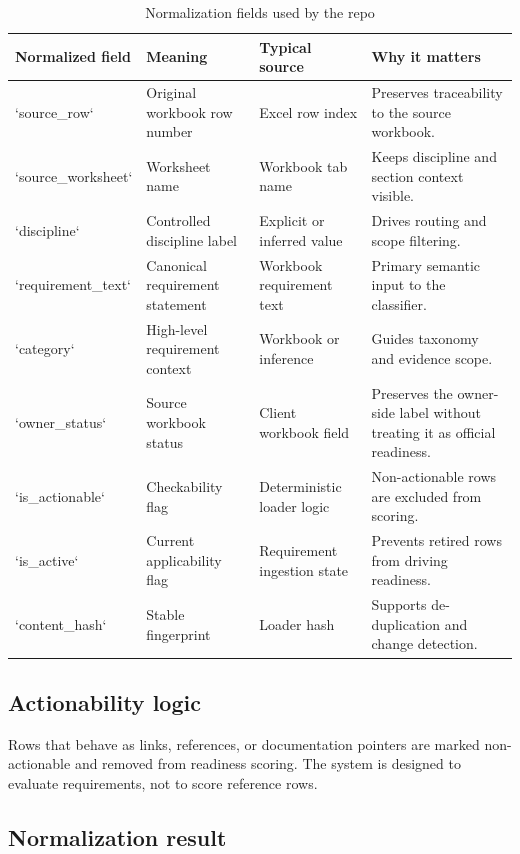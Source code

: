 \documentclass[10pt,letterpaper]{article}
\begin{document}
\begin{longtable}{p{1.5in}p{1.85in}p{2.0in}p{1.4in}}
\caption{Normalization fields used by the repo}\label{tab:normalization}\\
\toprule
\textbf{Normalized field} & \textbf{Meaning} & \textbf{Typical source} & \textbf{Why it matters} \\
\midrule
\endhead
`source_row` & Original workbook row number & Excel row index & Preserves traceability to the source workbook. \\
`source_worksheet` & Worksheet name & Workbook tab name & Keeps discipline and section context visible. \\
`discipline` & Controlled discipline label & Explicit or inferred value & Drives routing and scope filtering. \\
`requirement_text` & Canonical requirement statement & Workbook requirement text & Primary semantic input to the classifier. \\
`category` & High-level requirement context & Workbook or inference & Guides taxonomy and evidence scope. \\
`owner_status` & Source workbook status & Client workbook field & Preserves the owner-side label without treating it as official readiness. \\
`is_actionable` & Checkability flag & Deterministic loader logic & Non-actionable rows are excluded from scoring. \\
`is_active` & Current applicability flag & Requirement ingestion state & Prevents retired rows from driving readiness. \\
`content_hash` & Stable fingerprint & Loader hash & Supports de-duplication and change detection. \\
\bottomrule
\end{longtable}

\subsection{Actionability logic}

Rows that behave as links, references, or documentation pointers are marked non-actionable and removed from readiness scoring. The system is designed to evaluate requirements, not to score reference rows.

\subsection{Normalization result}
\end{document}
